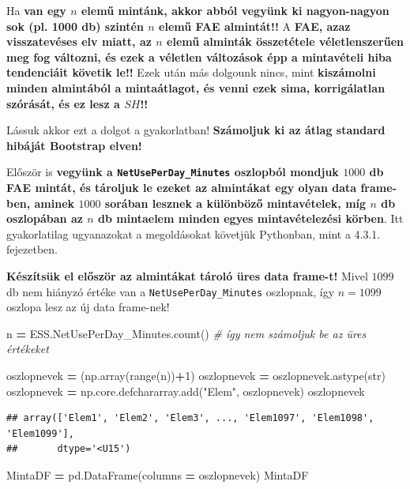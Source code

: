 \documentclass[
]{book}
\newenvironment{Shaded}{\begin{snugshade}}{\end{snugshade}}
\newcommand{\BuiltInTok}[1]{#1}
\newcommand{\CommentTok}[1]{\textcolor[rgb]{0.56,0.35,0.01}{\textit{#1}}}
\newcommand{\DecValTok}[1]{\textcolor[rgb]{0.00,0.00,0.81}{#1}}
\newcommand{\NormalTok}[1]{#1}
\newcommand{\OperatorTok}[1]{\textcolor[rgb]{0.81,0.36,0.00}{\textbf{#1}}}
\newcommand{\StringTok}[1]{\textcolor[rgb]{0.31,0.60,0.02}{#1}}
\begin{document}
Ha \textbf{van egy \(n\) elemű mintánk, akkor abból vegyünk ki nagyon-nagyon sok (pl. 1000 db) szintén \(n\) elemű FAE almintát!!} A \textbf{FAE, azaz visszatevéses elv miatt, az \(n\) elemű alminták összetétele véletlenszerűen meg fog változni, és ezek a véletlen változások épp a mintavételi hiba tendenciáit követik le!!}
Ezek után más dolgounk nincs, mint \textbf{kiszámolni minden almintából a mintaátlagot, és venni ezek sima, korrigálatlan szórását, és ez lesz a \(SH\)!!}

Lássuk akkor ezt a dolgot a gyakorlatban! \textbf{Számoljuk ki az átlag standard hibáját Bootstrap elven!}

Először is \textbf{vegyünk a \texttt{NetUsePerDay\_Minutes} oszlopból mondjuk \(1000\) db FAE mintát, és tároljuk le ezeket az almintákat egy olyan data frame-ben, aminek \(1000\) sorában lesznek a különböző mintavételek, míg \(n\) db oszlopában az \(n\) db mintaelem minden egyes mintavételezési körben}.
Itt gyakorlatilag ugyanazokat a megoldásokat követjük Pythonban, mint a 4.3.1. fejezetben.

\textbf{Készítsük el először az almintákat tároló üres data frame-t!} Mivel \(1099\) db nem hiányzó értéke van a \texttt{NetUsePerDay\_Minutes} oszlopnak, így \(n=1099\) oszlopa lesz az új data frame-nek!

\begin{Shaded}
\begin{Highlighting}[]
\NormalTok{n }\OperatorTok{=}\NormalTok{ ESS.NetUsePerDay\_Minutes.count() }\CommentTok{\# így nem számoljuk be az üres értékeket}

\NormalTok{oszlopnevek }\OperatorTok{=}\NormalTok{ (np.array(}\BuiltInTok{range}\NormalTok{(n))}\OperatorTok{+}\DecValTok{1}\NormalTok{)}
\NormalTok{oszlopnevek }\OperatorTok{=}\NormalTok{ oszlopnevek.astype(}\BuiltInTok{str}\NormalTok{)}
\NormalTok{oszlopnevek }\OperatorTok{=}\NormalTok{ np.core.defchararray.add(}\StringTok{"Elem"}\NormalTok{, oszlopnevek)}
\NormalTok{oszlopnevek}
\end{Highlighting}
\end{Shaded}

\begin{verbatim}
## array(['Elem1', 'Elem2', 'Elem3', ..., 'Elem1097', 'Elem1098', 'Elem1099'],
##       dtype='<U15')
\end{verbatim}

\begin{Shaded}
\begin{Highlighting}[]
\NormalTok{MintaDF }\OperatorTok{=}\NormalTok{ pd.DataFrame(columns }\OperatorTok{=}\NormalTok{ oszlopnevek)}
\NormalTok{MintaDF}
\end{Highlighting}
\end{Shaded}
\end{document}
